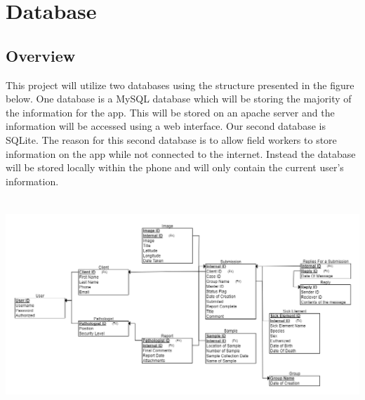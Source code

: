 \documentclass[onecolumn, draftclsnofoot,10pt, compsoc]{IEEEtran}
\begin{document}
\section{Database}
\subsection{Overview}
This project will utilize two databases using the structure presented in the figure below. One database is a MySQL database which will be storing the majority of the information for the app. This will be stored on an apache server and the information will be accessed using a web interface. Our second database is SQLite. The reason for this second database is to allow field workers to store information on the app while not connected to the internet. Instead the database will be stored locally within the phone and will only contain the current user's information.

\includegraphics[height = 8cm]{ER_diagram.png}
\end{document}
